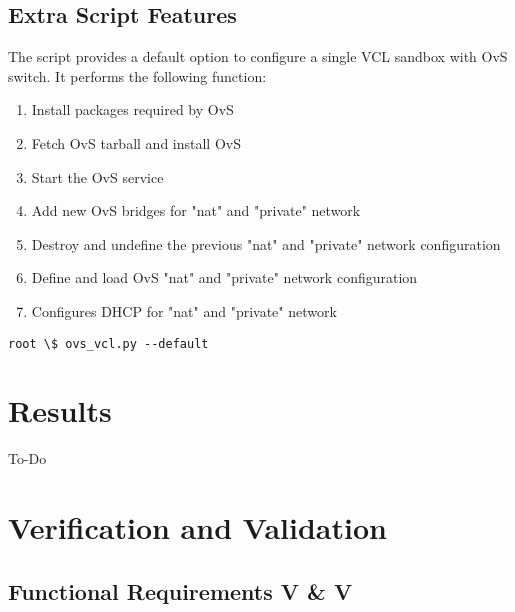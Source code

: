 \documentclass[12pt]{extarticle}
\begin{document}
\subsection{Extra Script Features}
The script provides a default option to configure a single VCL sandbox with OvS switch. It performs the following function:
\begin{enumerate}
    \item Install packages required by OvS
    \item Fetch OvS tarball and install OvS
    \item Start the OvS service
    \item Add new OvS bridges for "nat" and "private" network
    \item Destroy and undefine the previous "nat" and "private" network configuration
    \item Define and load OvS "nat" and "private" network configuration
    \item Configures DHCP for "nat" and "private" network
\end{enumerate}

\begin{verbatim}
root \$ ovs_vcl.py --default
\end{verbatim}


\section{Results}
To-Do
\section{Verification and Validation}

\subsection{Functional Requirements V \& V}
\end{document}
